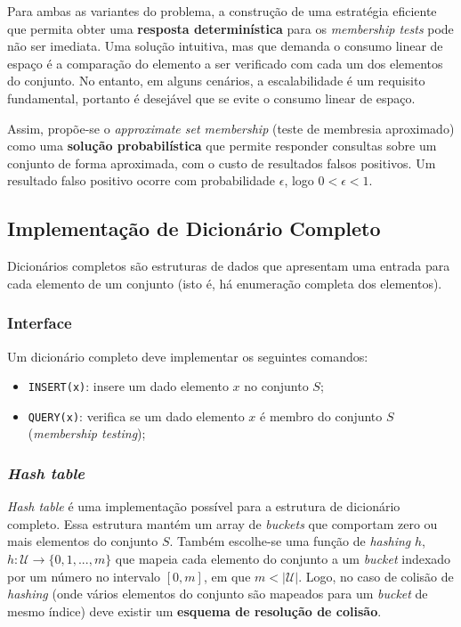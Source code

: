 \documentclass[12pt,twoside,english,brazilian]{article}
\begin{document}
Para ambas as variantes do problema, a construção de uma estratégia eficiente que permita obter uma \textbf{resposta determinística} para os \textit{membership tests} pode não ser imediata. Uma solução intuitiva, mas que demanda o consumo linear de espaço é a comparação do elemento a ser verificado com cada um dos elementos do conjunto. No entanto, em alguns cenários, a escalabilidade é um requisito fundamental, portanto é desejável que se evite o consumo linear de espaço.

Assim, propõe-se o \textit{approximate set membership} (teste de membresia aproximado) como uma \textbf{solução probabilística} que permite responder consultas sobre um conjunto de forma aproximada, com o custo de resultados falsos positivos. Um resultado falso positivo ocorre com probabilidade $\epsilon$, logo $0 < \epsilon < 1$.

\subsection{Implementação de Dicionário Completo}

Dicionários completos são estruturas de dados que apresentam uma entrada para cada elemento de um conjunto (isto é, há enumeração completa dos elementos).

\subsubsection{Interface}

Um dicionário completo deve implementar os seguintes comandos:
\begin{itemize}
    \item \texttt{INSERT(x)}: insere um dado elemento $x$ no conjunto $S$;
    \item \texttt{QUERY(x)}: verifica se um dado elemento $x$ é membro do conjunto $S$ (\textit{membership testing});
\end{itemize}

\subsubsection{\textit{Hash table}}

\textit{Hash table} é uma implementação possível para a estrutura de dicionário completo. Essa estrutura mantém um array de \textit{buckets} que comportam zero ou mais elementos do conjunto $S$. Também escolhe-se uma função de \textit{hashing} $h$, $h: \mathcal{U} \xrightarrow{} \{0,1,...,m\}$ que mapeia cada elemento do conjunto a um \textit{bucket} indexado por um número no intervalo $[0,m]$, em que $m < |\mathcal{U}|$. Logo, no caso de colisão de \textit{hashing} (onde vários elementos do conjunto são mapeados para um \textit{bucket} de mesmo índice) deve existir um \textbf{esquema de resolução de colisão}.
\end{document}
